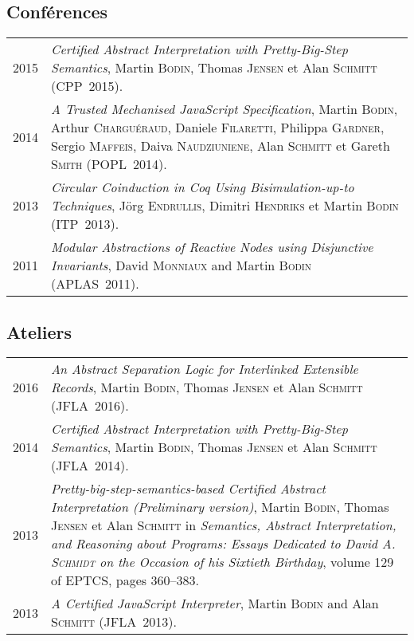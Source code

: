 \documentclass[12pt,a4paper]{article}
\makeatletter
\newenvironment{datecvsection}[1]%
               {\subsection*{#1}%
                 \noindent \begin{tabular}{@{}p{\annee}p{\texte}@{}}}
               {\end{tabular}}
\makeatother
\begin{document}
\begin{datecvsection}{Conférences}

  2015 & \textit{Certified Abstract Interpretation with Pretty-Big-Step Semantics}, Martin \textsc{Bodin}, Thomas \textsc{Jensen} et Alan \textsc{Schmitt} (CPP~2015). \\

  2014 & \textit{A Trusted Mechanised JavaScript Specification}, Martin \textsc{Bodin}, Arthur \textsc{Charguéraud}, Daniele \textsc{Filaretti}, Philippa \textsc{Gardner}, Sergio \textsc{Maffeis}, Daiva \textsc{Naudziuniene}, Alan \textsc{Schmitt} et Gareth \textsc{Smith} (POPL~2014). \\

  2013 & \textit{Circular Coinduction in Coq Using Bisimulation-up-to Techniques}, Jörg \textsc{Endrullis}, Dimitri \textsc{Hendriks} et Martin \textsc{Bodin} (ITP~2013). \\

  2011 & \textit{Modular Abstractions of Reactive Nodes using Disjunctive Invariants}, David \textsc{Monniaux} and Martin \textsc{Bodin} (APLAS~2011). \\

\end{datecvsection}

\begin{datecvsection}{Ateliers}

  2016 & \textit{An Abstract Separation Logic for Interlinked Extensible Records}, Martin \textsc{Bodin}, Thomas \textsc{Jensen} et Alan \textsc{Schmitt} (JFLA~2016). \\

  2014 & \textit{Certified Abstract Interpretation with Pretty-Big-Step Semantics}, Martin \textsc{Bodin}, Thomas \textsc{Jensen} et Alan \textsc{Schmitt} (JFLA~2014). \\

  2013 & \textit{Pretty-big-step-semantics-based Certified Abstract Interpretation (Preliminary version)}, Martin \textsc{Bodin}, Thomas \textsc{Jensen} et Alan \textsc{Schmitt} in \textit{Semantics, Abstract Interpretation, and Reasoning about Programs: Essays Dedicated to David A. \textsc{Schmidt} on the Occasion of his Sixtieth Birthday}, volume 129 of EPTCS, pages 360–383. \\

  2013 & \textit{A Certified JavaScript Interpreter}, Martin \textsc{Bodin} and Alan \textsc{Schmitt} (JFLA~2013). \\

\end{datecvsection}
\end{document}
